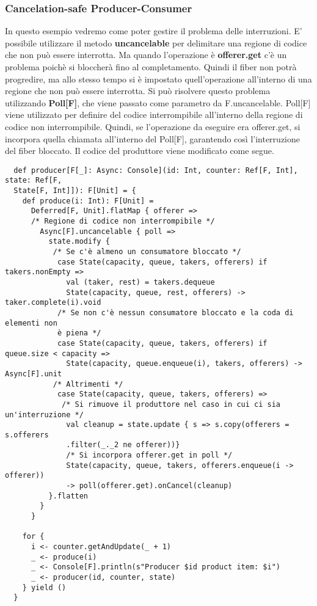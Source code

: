\subsubsection{Cancelation-safe Producer-Consumer}
In questo esempio vedremo come poter gestire il problema delle interruzioni. E' possibile utilizzare il metodo \textbf{uncancelable} per delimitare una regione di codice che non può essere interrotta. Ma quando l’operazione è \textbf{offerer.get} c’è un problema poichè si bloccherà fino al completamento. Quindi il fiber non potrà progredire, ma allo stesso tempo si è impostato quell’operazione all’interno di una regione che non può essere interrotta. Si può risolvere questo problema utilizzando \textbf{Poll[F]}, che viene passato come parametro da F.uncancelable. Poll[F] viene utilizzato per definire del codice interrompibile all’interno della regione di codice non interrompibile. Quindi, se l’operazione da
eseguire era offerer.get, si incorpora quella chiamata all’interno del Poll[F], garantendo così l’interruzione del fiber bloccato. Il codice del produttore viene modificato come segue.
\begin{verbatim}
  def producer[F[_]: Async: Console](id: Int, counter: Ref[F, Int], state: Ref[F, 
  State[F, Int]]): F[Unit] = {
    def produce(i: Int): F[Unit] =
      Deferred[F, Unit].flatMap { offerer =>
      /* Regione di codice non interrompibile */
        Async[F].uncancelable { poll =>
          state.modify {
           /* Se c'è almeno un consumatore bloccato */
            case State(capacity, queue, takers, offerers) if takers.nonEmpty =>
              val (taker, rest) = takers.dequeue
              State(capacity, queue, rest, offerers) -> taker.complete(i).void
            /* Se non c'è nessun consumatore bloccato e la coda di elementi non
            è piena */
            case State(capacity, queue, takers, offerers) if queue.size < capacity =>
              State(capacity, queue.enqueue(i), takers, offerers) -> Async[F].unit
           /* Altrimenti */
            case State(capacity, queue, takers, offerers) =>
             /* Si rimuove il produttore nel caso in cui ci sia un'interruzione */
              val cleanup = state.update { s => s.copy(offerers = s.offerers
              .filter(_._2 ne offerer))}
              /* Si incorpora offerer.get in poll */
              State(capacity, queue, takers, offerers.enqueue(i -> offerer)) 
              -> poll(offerer.get).onCancel(cleanup)
          }.flatten
        }
      }

    for {
      i <- counter.getAndUpdate(_ + 1) 
      _ <- produce(i)
      _ <- Console[F].println(s"Producer $id product item: $i")
      _ <- producer(id, counter, state)
    } yield ()
  }   
\end{verbatim}


